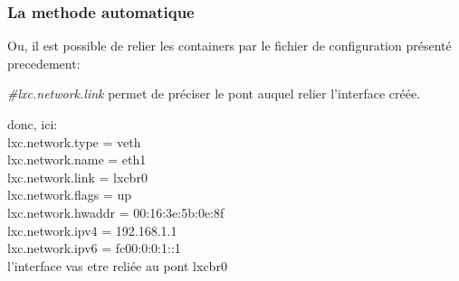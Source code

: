 \documentclass[twoside]{article}
\begin{document}
\subsubsection{La methode automatique}

Ou, il est possible de relier les containers par le fichier de configuration pr\'esent\'e precedement:

\noindent
\emph{\#lxc.network.link} permet de pr\'eciser le pont auquel relier l'interface cr\'e\'ee.

donc, ici:\\

\noindent
lxc.network.type = veth\\
lxc.network.name = eth1\\
lxc.network.link = lxcbr0\\
lxc.network.flags = up\\
lxc.network.hwaddr = 00:16:3e:5b:0e:8f\\
lxc.network.ipv4 = 192.168.1.1\\
lxc.network.ipv6 = fc00:0:0:1::1\\

l'interface vas etre reli\'ee au pont lxcbr0
\end{document}
